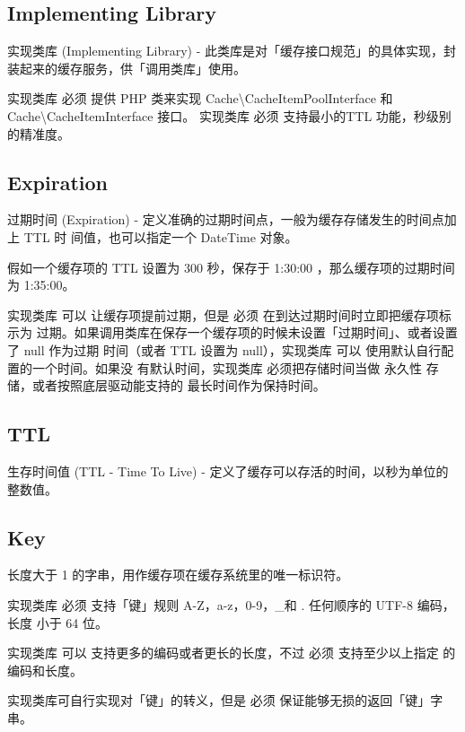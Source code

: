 \subsection{Implementing Library}

实现类库 (Implementing Library) - 此类库是对「缓存接口规范」的具体实现，封装起来的缓存服务，供「调用类库」使用。

实现类库 必须 提供 PHP 类来实现 Cache\textbackslash CacheItemPoolInterface 和 Cache\textbackslash CacheItemInterface 接口。 实现类库 必须 支持最小的TTL 功能，秒级别的精准度。

\subsection{Expiration}

过期时间 (Expiration) - 定义准确的过期时间点，一般为缓存存储发生的时间点加上 TTL 时 间值，也可以指定一个 DateTime 对象。

假如一个缓存项的 TTL 设置为 300 秒，保存于 1:30:00 ，那么缓存项的过期时间为 1:35:00。

实现类库 可以 让缓存项提前过期，但是 必须 在到达过期时间时立即把缓存项标示为 过期。如果调用类库在保存一个缓存项的时候未设置「过期时间」、或者设置了 null 作为过期 时间（或者 TTL 设置为 null），实现类库 可以 使用默认自行配置的一个时间。如果没 有默认时间，实现类库 必须把存储时间当做 永久性 存储，或者按照底层驱动能支持的 最长时间作为保持时间。

\subsection{TTL}

生存时间值 (TTL - Time To Live) - 定义了缓存可以存活的时间，以秒为单位的整数值。



\subsection{Key}

长度大于 1 的字串，用作缓存项在缓存系统里的唯一标识符。

\begin{compactitem}
\item 实现类库 必须 支持「键」规则 A-Z，a-z，0-9，\_和 . 任何顺序的 UTF-8 编码，长度 小于 64 位。
\item 实现类库 可以 支持更多的编码或者更长的长度，不过 必须 支持至少以上指定 的编码和长度。
\item 实现类库可自行实现对「键」的转义，但是 必须 保证能够无损的返回「键」字串。
\end{compactitem}


